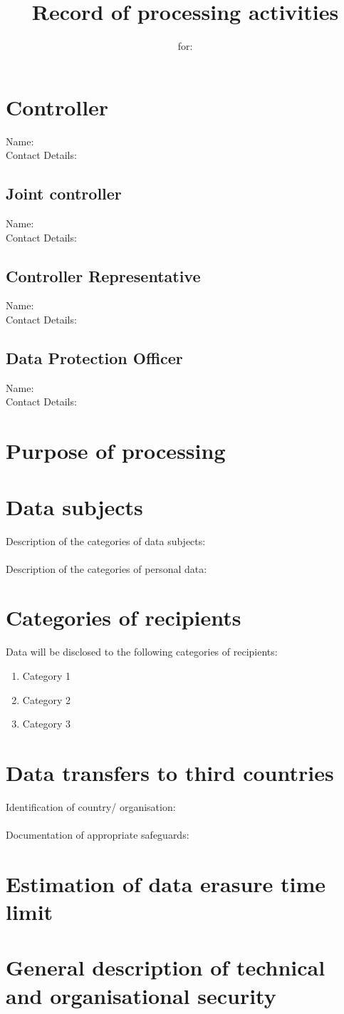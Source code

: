 \documentclass[11pt]{article}
\title{\textbf{Record of processing activities}}
\author{for: }
\date{}
\begin{document}
\maketitle
\section{Controller}
Name:\\
Contact Details:\\
\subsection*{Joint controller}
Name:\\
Contact Details:\\

\subsection*{Controller Representative}
Name:\\
Contact Details:\\

\subsection*{Data Protection Officer}
Name:\\
Contact Details:\\
\section{Purpose of processing}

\section{Data subjects}
Description of the categories of data subjects:\\
\\
Description of the categories of personal data:\\
\section{Categories of recipients}
Data will be disclosed to the following categories of recipients:\\
\begin{enumerate}
  \item Category 1
  \item Category 2
  \item Category 3
\end{enumerate}

\section{Data transfers to third countries}
Identification of country/ organisation:\\
\\
Documentation of appropriate safeguards:\\
\section{Estimation of data erasure time limit}
\section{General description of technical and organisational security}
\end{document}
